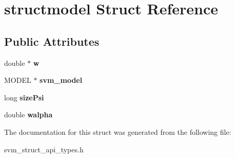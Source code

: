 \hypertarget{structstructmodel}{}\section{structmodel Struct Reference}
\label{structstructmodel}
\subsection*{Public Attributes}
\begin{DoxyCompactItemize}
\item 
\hypertarget{structstructmodel_aa573867b56ea1a5f146b3d880ab9fa12}{}double $\ast$ {\bfseries w}\label{structstructmodel_aa573867b56ea1a5f146b3d880ab9fa12}

\item 
\hypertarget{structstructmodel_a9b9c6747df2598d651696d0cff2c4553}{}M\+O\+D\+E\+L $\ast$ {\bfseries svm\+\_\+model}\label{structstructmodel_a9b9c6747df2598d651696d0cff2c4553}

\item 
\hypertarget{structstructmodel_ab1f9132f70ae3be8117107b8a8e735fb}{}long {\bfseries size\+Psi}\label{structstructmodel_ab1f9132f70ae3be8117107b8a8e735fb}

\item 
\hypertarget{structstructmodel_ae26744d75278335917287bd10f8a41d0}{}double {\bfseries walpha}\label{structstructmodel_ae26744d75278335917287bd10f8a41d0}

\end{DoxyCompactItemize}


The documentation for this struct was generated from the following file\+:\begin{DoxyCompactItemize}
\item 
svm\+\_\+struct\+\_\+api\+\_\+types.\+h\end{DoxyCompactItemize}
